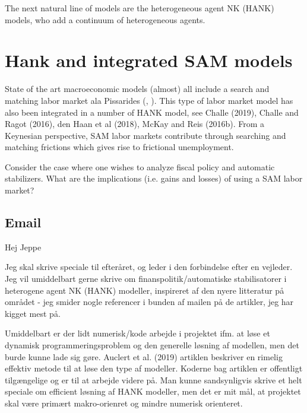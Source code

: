 The next natural line of models are the heterogeneous agent NK (HANK) models, who add a continuum of heterogeneous agents.  



\section{Hank and integrated SAM models}
State of the art macroeconomic models (almost) all include a search and matching labor market ala Pissarides (\cite{pissarides2000equilibrium}, \cite{mortensen1994job}). This type of labor market model has also been integrated in a number of HANK model, see Challe (2019), Challe and Ragot (2016), den Haan et al (2018), McKay and Reis (2016b). From a Keynesian perspective, SAM labor markets contribute through searching and matching frictions which gives rise to frictional unemployment. 

Consider the case where one wishes to analyze fiscal policy and automatic stabilizers. What are the implications (i.e. gains and losses) of using a SAM labor market?   












\pagebreak
\subsection{Email} 

Hej Jeppe  

Jeg skal skrive speciale til efteråret, og leder i den forbindelse efter en vejleder. 
Jeg vil umiddelbart gerne skrive om finanspolitik/automatiske stabilisatorer i heterogene agent NK (HANK) modeller, inspireret af den nyere litteratur på området - jeg smider nogle referencer i bunden af mailen på de artikler, jeg har kigget mest på. 

Umiddelbart er der lidt numerisk/kode arbejde i projektet ifm. at løse et dynamisk programmeringsproblem og den generelle løsning af modellen, men det burde kunne lade sig gøre. Auclert et al. (2019) artiklen beskriver en rimelig effektiv metode til at løse den type af modeller. Koderne bag artiklen er offentligt tilgængelige og er til at arbejde videre på. Man kunne sandsynligvis skrive et helt speciale om efficient løsning af HANK modeller, men det er mit mål, at projektet skal være primært makro-orienret og mindre numerisk orienteret. 

